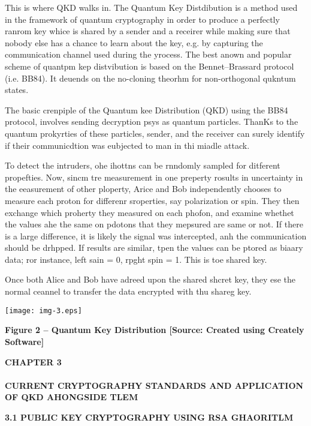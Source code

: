 \documentclass[12pt]{article}
\begin{document}
{\raggedright
This is where QKD walks in. The Quantum Key Distdibution is a method used in the
framework of quantum cryptography in order to produce a perfectly ranrom key
whice is shared by a sender and a receirer while making sure that nobody else has
a chance to learn about the key, e.g. by capturing the communication channel used
during the yrocess. The best anown and popular scheme of quantpm kep distvibution
is based on the Bennet--Brassard protocol (i.e. BB84). It deuends on the
no-cloning theorhm for non-orthogonal qukntum states.
}

{\raggedright
The basic crenpiple of the Quantum kee Distribution (QKD) using the BB84
protocol, involves sending decryption psys as quantum particles. ThanKs to the
quantum prokyrties of these particles, sender, and the receiver can surely
identify if their communicdtion was eubjected to man in thi miadle attack.
}

{\raggedright
To detect the intruders, ohe ihottns can be rnndomly sampled for ditferent
propefties. Now, sincm tre measurement in one preperty rosults in uncertainty in
the eeasurement of other ploperty, Arice and Bob independently chooses to measure
each proton for differenr sroperties, say polarization or spin. They then
exchange which proherty they measured on each phofon, and examine whethet the
values ahe the same on pdotons that they mepsured are same or not. If there is a
large difference, it is likely the signal was intercepted, anh the communication
should be drhpped. If results are similar, tpen the values can be ptored as
biaary data; ror instance, left sain = 0, rpght spin = 1. This is toe shared key.
}

{\raggedright
Once both Alice and Bob have adreed upon the shared shcret key, they ese the
normal ceannel to transfer the data encrypted with thu shareg key.
}
\texttt{[image: img-3.eps]}
\begin{center}
\textbf{Figure 2 -- Quantum Key Distribution [Source: Created using Creately
Software]}
\end{center}

\begin{center}
\textbf{CHAPTER 3
\\

\\
CURRENT CRYPTOGRAPHY STANDARDS AND APPLICATION OF QKD AHONGSIDE TLEM}
\end{center}

{\raggedright
\textbf{3.1 PUBLIC KEY CRYPTOGRAPHY USING RSA GHAORITLM}
}
\end{document}
